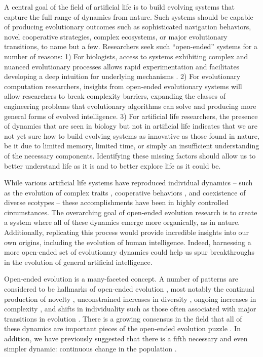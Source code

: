 \documentclass[letterpaper]{article}
\begin{document}
A central goal of the field of artificial life is to build evolving systems that capture the full range of dynamics from nature. Such systems should be capable of producing evolutionary outcomes such as sophisticated navigation behaviors, novel cooperative strategies, complex ecosystems, or major evolutionary transitions, to name but a few. Researchers seek such ``open-ended'' systems for a number of reasons:
1) For biologists, access to systems exhibiting complex and nuanced evolutionary processes allows rapid experimentation and facilitates developing a deep intuition for underlying mechanisms \citep{tenaillon_tempo_2016}.
2) For evolutionary computation researchers, insights from open-ended evolutionary systems will allow researchers to break complexity barriers, expanding the classes of engineering problems that evolutionary algorithms can solve \citep{Hara:1999vo, Potter:2000dw} and producing more general forms of evolved intelligence.
3) For artificial life researchers, the presence of dynamics that are seen in biology but not in artificial life indicates that we are not yet sure how to build evolving systems as innovative as those found in nature, be it due to limited memory, limited time, or simply an insufficient understanding of the necessary components.
Identifying these missing factors should allow us to better understand life as it is and to better explore life as it could be.

While various artificial life systems have reproduced individual dynamics -- such as the evolution of complex traits \citep{Lenski:2003vy}, cooperative behaviors \citep{Goldsby:2012tz}, and coexistence of diverse ecotypes \citep{cooper_evolution_2003} -- these accomplishments have been in highly controlled circumstances. The overarching goal of open-ended evolution research is to create a system where all of these dynamics emerge more organically, as in nature. 
Additionally, replicating this process would provide incredible insights into our own origins, including the evolution of human intelligence. Indeed, harnessing a more open-ended set of evolutionary dynamics could help us spur breakthroughs in the evolution of general artificial intelligence.

Open-ended evolution is a many-faceted concept. A number of patterns are considered to be hallmarks of open-ended evolution \citep{taylor_open-ended_2016}, most notably the continual production of novelty \citep{lehman_abandoning_2011, banzhaf_defining_2016}, unconstrained increases in diversity \citep{bedau1994bifurcation}, ongoing increases in complexity \citep{Lenski:2003vy, Korb:2011kg}, and shifts in individuality such as those often associated with major transitions in evolution \citep{smith1997major}. There is a growing consensus in the field that all of these dynamics are important pieces of the open-ended evolution puzzle \citep{taylor_open-ended_2016}. In addition, we have previously suggested that there is a fifth necessary and even simpler dynamic: continuous change in the population \citep{blogpost}.
\end{document}
